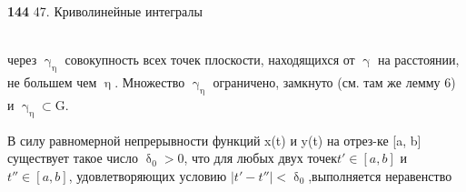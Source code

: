 \documentclass[a5paper, 11pt, twoside]{article}
\renewcommand{\baselinestretch}{0.8}
\begin{document}
{\noindent\scriptsize{\bfseries 144}
\hfill{\textsection{ } 47. Криволинейные интегралы}\\ \\}
{\renewcommand{\baselinestretch}{5.00}
  через $\upgamma_\upeta$ совокупность всех точек плоскости, находящихся от $\upgamma$ на расстоянии, не большем чем $\upeta$. Множество $\upgamma_\upeta$ ограничено, замкнуто (см. там же лемму 6) и $\upgamma_\upeta{\subset}$G.
\par В силу равномерной непрерывности функций x(t) и y(t) на отрез-\linebreak ке
[a, b] существует такое число $\updelta_0 > 0$, что для любых двух точек\linebreak $t' \in[a,b]$ и $t''\in[a, b]$, удовлетворяющих условию $|t' - t''| < \updelta_0$,\linebreak выполняется неравенство
}
\end{document}
